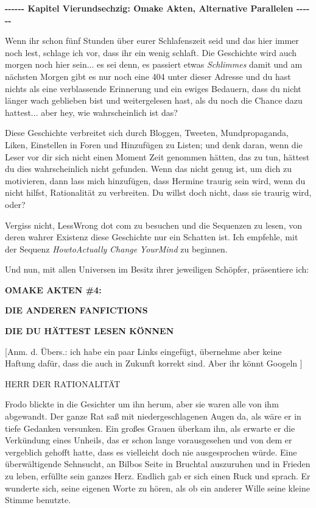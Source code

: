 

\hypertarget{omake-akten-alternative-parallelen}{%

\textbf{-\/-\/-\/-\/-\/- Kapitel Vierundsechzig: Omake Akten, Alternative Parallelen -\/-\/-\/-\/-\/-}

Wenn ihr schon fünf Stunden über eurer Schlafenszeit seid und das hier immer noch lest, schlage ich vor, dass ihr ein wenig schlaft. Die Geschichte wird auch morgen noch hier sein... es sei denn, es passiert etwas \emph{Schlimmes} damit und am nächsten Morgen gibt es nur noch eine 404 unter dieser Adresse und du hast nichts als eine verblassende Erinnerung und ein ewiges Bedauern, dass du nicht länger wach geblieben bist und weitergelesen hast, als du noch die Chance dazu hattest... aber hey, wie wahrscheinlich ist das?

Diese Geschichte verbreitet sich durch Bloggen, Tweeten, Mundpropaganda, Liken, Einstellen in Foren und Hinzufügen zu Listen; und denk daran, wenn die Leser vor dir sich nicht einen Moment Zeit genommen hätten, das zu tun, hättest du dies wahrscheinlich nicht gefunden. Wenn das nicht genug ist, um dich zu motivieren, dann lass mich hinzufügen, dass Hermine traurig sein wird, wenn du nicht hilfst, Rationalität zu verbreiten. Du willst doch nicht, dass sie traurig wird, oder?

Vergiss nicht, LessWrong dot com zu besuchen und die Sequenzen zu lesen, von deren wahrer Existenz diese Geschichte nur ein Schatten ist. Ich empfehle, mit der Sequenz \emph{HowtoActually} \emph{Change} \emph{YourMind} zu beginnen.

Und nun, mit allen Universen im Besitz ihrer jeweiligen Schöpfer, präsentiere ich:

\textbf{\textbf{OMAKE} \textbf{AKTEN} \textbf{\#4:}}

\textbf{\textbf{DIE ANDEREN FANFICTIONS}}

\textbf{\textbf{DIE DU HÄTTEST LESEN KÖNNEN}}

{[}Anm. d. Übers.: ich habe ein paar Links eingefügt, übernehme aber keine Haftung dafür, dass die auch in Zukunft korrekt sind. Aber ihr könnt Googeln {]}

HERR DER RATIONALITÄT

Frodo blickte in die Gesichter um ihn herum, aber sie waren alle von ihm abgewandt. Der ganze Rat saß mit niedergeschlagenen Augen da, als wäre er in tiefe Gedanken versunken. Ein großes Grauen überkam ihn, als erwarte er die Verkündung eines Unheils, das er schon lange vorausgesehen und von dem er vergeblich gehofft hatte, dass es vielleicht doch nie ausgesprochen würde. Eine überwältigende Sehnsucht, an Bilbos Seite in Bruchtal auszuruhen und in Frieden zu leben, erfüllte sein ganzes Herz. Endlich gab er sich einen Ruck und sprach. Er wunderte sich, seine eigenen Worte zu hören, als ob ein anderer Wille seine kleine Stimme benutzte.

}
